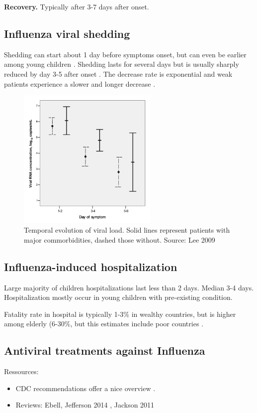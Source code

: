 \documentclass[11pt, onecolumn]{article}
\begin{document}
\textbf{Recovery.} Typically after 3-7 days after onset.


\subsection{Influenza viral shedding}

Shedding can start about 1 day before symptoms onset, but can even be earlier among young children \cite{CDC:2011wq}. Shedding lasts for several days but is usually sharply reduced by day 3-5 after onset \cite{CDC:2011wq}. The decrease rate is exponential and weak patients experience a slower and longer decrease \cite{Lee:2009dc}.

\begin{figure}[!ht]
\centering
    \includegraphics[angle=0,width=0.6\textwidth]{figures/VL_Lee.png}
\caption{Temporal evolution of viral load. Solid lines represent patients with major commorbidities, dashed those without. Source: Lee 2009 \cite{Lee:2009dc}}
\label{fig:VL_Lee}
\end{figure}


\subsection{Influenza-induced hospitalization}

Large majority of children hospitalizations last less than 2 days. Median 3-4 days. Hospitalization mostly occur in young children with pre-existing condition.

Fatality rate in hospital is typically 1-3\% in wealthy countries, but is higher among elderly (6-30\%, but this estimates include poor countries \cite{Wong:2015bb}.


\subsection{Antiviral treatments against Influenza }
\label{sec:antiviral}
Ressources:
\begin{itemize}
\item  CDC recommendations offer a nice overview \cite{CDC:2011wq}.
\item Reviews: Ebell\cite{Ebell:2014ic},  Jefferson 2014 \cite{Jefferson:2014ei}, Jackson 2011 \cite{Jackson:2011ff}
\end{itemize}
\end{document}
